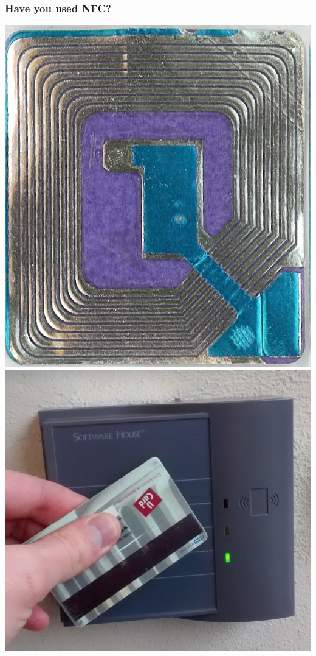 \documentclass[unknownkeysallowed]{beamer}
\begin{document}
\begin{frame}
\frametitle{Have you used NFC?}
  		\begin{block}{}
  		  \begin{center}
    		\includegraphics[width=\linewidth,height=0.3\textheight,keepaspectratio]{figures/wikimediatag.jpg}
    		\includegraphics[width=\linewidth,height=0.3\textheight,keepaspectratio]{figures/gayHall.jpg}

\end{center}
\end{block}
\end{frame}
\end{document}
